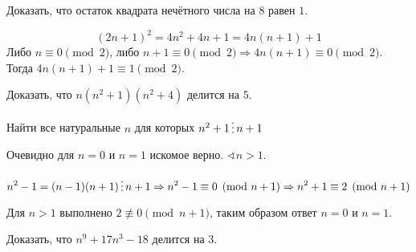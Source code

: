 

\cfoot{}



\begin{exercise}
    Доказать, что остаток квадрата нечётного числа на \(8\) равен \(1\).
\end{exercise}
\begin{solution}
    \[(2n + 1)^2 = 4n^2 + 4n + 1 = 4n(n + 1) + 1\]
    Либо \(n \equiv 0 \pmod 2\), либо \(n + 1 \equiv 0 \pmod 2 \Rightarrow 4n(n + 1) \equiv 0 \pmod 2\). Тогда \(4n(n + 1) + 1 \equiv 1 \pmod 2\).
\end{solution}

\begin{exercise}
    Доказать, что \(n(n^2 + 1)(n^2 + 4)\) делится на \(5\).
\end{exercise}
\begin{solution}\itemfix
    \begin{caseof}
    \end{caseof}
\end{solution}

\begin{exercise}
    Найти все натуральные \(n\) для которых \(n^2 + 1 \divided n + 1\)
\end{exercise}
\begin{solution}
    Очевидно для \(n = 0\) и \(n = 1\) искомое верно. \(\sphericalangle n > 1\).

    \[n^2 - 1 = (n - 1)(n + 1) \divided n + 1 \Rightarrow n^2 - 1 \equiv 0 \pmod{n + 1} \Rightarrow n^2 + 1 \equiv 2 \pmod{n + 1}\]

    Для \(n > 1\) выполнено \(2 \not \equiv 0 \pmod{n + 1}\), таким образом ответ \(n = 0\) и \(n = 1\).
\end{solution}

\begin{exercise}
    Доказать, что \(n^9 + 17n^3 - 18\) делится на \(3\).
\end{exercise}
\begin{solution}
    \begin{caseof}
    \end{caseof}
\end{solution}

